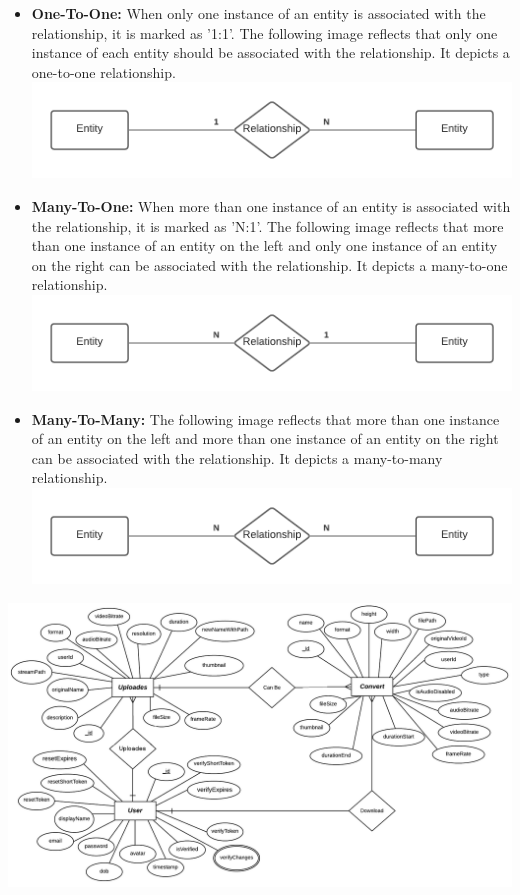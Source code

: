\begin{itemize}
\begin{itemize}
		\begin{itemize}
			\item
			\textbf{One-To-One: }When only one instance of an entity is associated with the relationship, it is marked as '1:1'. The following image reflects that only one instance of each entity should be associated with the relationship. It depicts a one-to-one relationship.
			\vs
			\includegraphics[width=14cm]{121.png}
			\vs
			\item
			\textbf{Many-To-One: }When more than one instance of an entity is associated with the relationship, it is marked as 'N:1'. The following image reflects that more than one instance of an entity on the left and only one instance of an entity on the right can be associated with the relationship. It depicts a many-to-one relationship.
			\vs
			\includegraphics[width=14cm]{m21.png}
			\vs
			\item
			\textbf{Many-To-Many: }The following image reflects that more than one instance of an entity on the left and more than one instance of an entity on the right can be associated with the relationship. It depicts a many-to-many relationship.
			\vs
			\includegraphics[width=14cm]{m2m.png}
		\end{itemize}
	\end{itemize}
	\end{itemize}
	\pagebreak
	\begin{center}
		\includegraphics[width=25cm,angle=90]{er.png}
	\end{center}